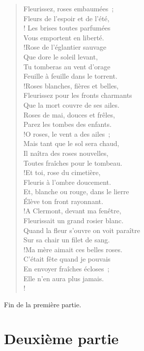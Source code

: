 \documentclass[french,twoside]{book} %
\newcommand\chapteropen{} %
\newcommand\chapterclose{} %
\begin{document}
\begin{verse}
Fleurissez, roses embaumées ;\\
Fleurs de l’espoir et de l’été,\\! Les brises toutes parfumées \\
Vous emportent en liberté.\\!Rose de l’églantier sauvage\\
Que dore le soleil levant,\\
Tu tomberas au vent d’orage\\
Feuille à feuille dans le torrent.\\!Roses blanches, fières et belles,\\
Fleurissez pour les fronts charmants\\
Que la mort couvre de ses ailes.\\
Roses de mai, douces et frêles,\\
Parez les tombes des enfants.\\!O roses, le vent a des ailes ;\\
Mais tant que le sol sera chaud,\\
Il naîtra des roses nouvelles,\\
Toutes fraîches pour le tombeau.\\!Et toi, rose du cimetière,\\
Fleuris à l’ombre doucement.\\
Et, blanche ou rouge, dans le lierre\\
Élève ton front rayonnant.\\!A Clermont, devant ma fenêtre,\\
Fleurissait un grand rosier blanc.\\
Quand la fleur s’ouvre on voit paraître\\
Sur sa chair un filet de sang.\\!Ma mère aimait ces belles roses.\\
C’était fête quand je pouvais\\
En envoyer fraîches écloses ;\\
Elle n’en aura plus jamais.\\!
\end{verse}



\begin{raggedleft}Fin de la première partie.\end{raggedleft}
\chapterclose

\chapterclose


\chapteropen
 \part[{Deuxième partie}]{Deuxième partie}
\label{p2}\renewcommand{\leftmark}{Deuxième partie}
\end{document}
